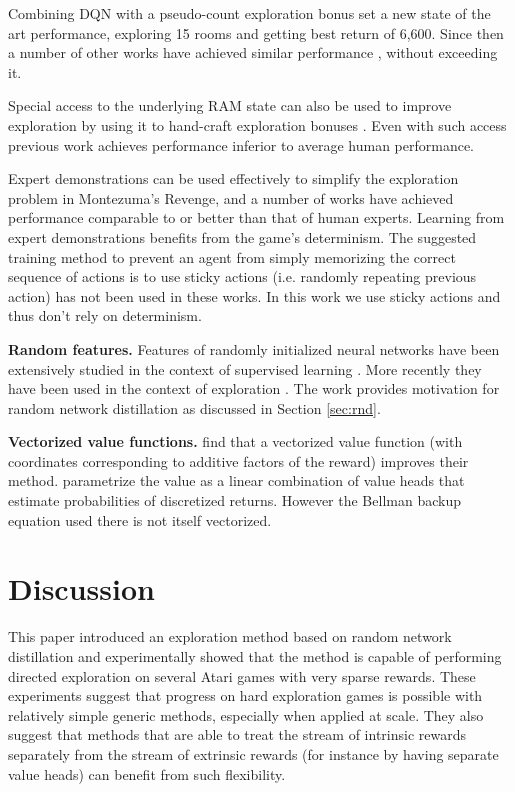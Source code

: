 \documentclass{article} \usepackage[dvipsnames]{xcolor}
\begin{document}
Combining DQN with a pseudo-count exploration bonus \cite{bellemare2016unifying} set a new state of the art performance, exploring 15 rooms and getting best return of 6,600. Since then a number of other works have achieved similar performance \citep{o2017uncertainty,neuralcount,machado2018count,osband2018randomized}, without exceeding it.

Special access to the underlying RAM state can also be used to improve exploration by using it to hand-craft exploration bonuses \citep{kulkarni2016hierarchical,tang2016exploration,stanton2018deep}. Even with such access previous work achieves performance inferior to average human performance.

Expert demonstrations can be used effectively to simplify the exploration problem in Montezuma's Revenge, and a number of works \citep{salimans2018mz, pohlen2018observe,aytar2018playing,garmulewicz2018expert} have achieved performance comparable to or better than that of human experts. Learning from expert demonstrations benefits from the game's determinism. The suggested training method \citep{machado2017revisiting} to prevent an agent from simply memorizing the correct sequence of actions is to use sticky actions (i.e. randomly repeating previous action) has not been used in these works. In this work we use sticky actions and thus don't rely on determinism.

\textbf{Random features.} Features of randomly initialized neural networks have been extensively studied in the context of supervised learning \citep{rahimi2008random, saxe2011random, jarrett2009best, yang2015deep}. More recently they have been used in the context of exploration \citep{osband2018randomized, burda18largescale}. The work \cite{osband2018randomized} provides motivation for random network distillation as discussed in Section \ref{sec:rnd}.

\textbf{Vectorized value functions.} \cite{pong2018temporal} find that a vectorized value function (with coordinates corresponding to additive factors of the reward) improves their method. \cite{bellemare2017distributional} parametrize the value as a linear combination of value heads that estimate probabilities of discretized returns. However the Bellman backup equation used there is not itself vectorized.

\section{Discussion}
This paper introduced an exploration method based on random network distillation and experimentally showed that the method is capable of performing directed exploration on several Atari games with very sparse rewards. These experiments suggest that progress on hard exploration games is possible with relatively simple generic methods, especially when applied at scale. They also suggest that methods that are able to treat the stream of intrinsic rewards separately from the stream of extrinsic rewards (for instance by having separate value heads) can benefit from such flexibility.
\end{document}
